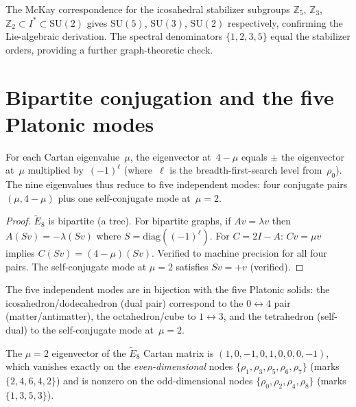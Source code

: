 \begin{remark}
The McKay correspondence for the icosahedral stabilizer subgroups
$\mathbb{Z}_5$, $\mathbb{Z}_3$, $\mathbb{Z}_2 \subset I^* \subset \mathrm{SU}(2)$
gives $\mathrm{SU}(5)$, $\mathrm{SU}(3)$, $\mathrm{SU}(2)$
respectively, confirming the Lie-algebraic derivation.
The spectral denominators $\{1,2,3,5\}$ equal the stabilizer orders,
providing a further graph-theoretic check.
\end{remark}

\section{Bipartite conjugation and the five Platonic modes}
\label{sec:bipartite}

\begin{theorem}\label{thm:bipartite}
For each Cartan eigenvalue~$\mu$, the eigenvector at~$4-\mu$ equals
$\pm$ the eigenvector at~$\mu$ multiplied by~$(-1)^{\ell}$
(where~$\ell$ is the breadth-first-search level from~$\rho_0$).
The nine eigenvalues thus reduce to five independent modes:
four conjugate pairs $(\mu, 4-\mu)$ plus one self-conjugate mode at~$\mu = 2$.
\end{theorem}

\begin{proof}
$\tilde{E}_8$ is bipartite (a tree).  For bipartite graphs,
if $Av = \lambda v$ then $A(Sv) = -\lambda(Sv)$ where $S = \mathrm{diag}((-1)^\ell)$.
For $C = 2I - A$: $Cv = \mu v$ implies $C(Sv) = (4-\mu)(Sv)$.
Verified to machine precision for all four pairs.
The self-conjugate mode at $\mu = 2$ satisfies $Sv = +v$ (verified).
\end{proof}

The five independent modes are in bijection with the five Platonic solids:
the icosahedron/dodecahedron (dual pair) correspond to the $0 \leftrightarrow 4$
pair (matter/antimatter), the octahedron/cube to $1 \leftrightarrow 3$,
and the tetrahedron (self-dual) to the self-conjugate mode at~$\mu = 2$.

\begin{corollary}[$\mu = 2$ vanishing on even-dimensional nodes]\label{cor:mu2-vanishing}
The $\mu = 2$ eigenvector of the $\tilde{E}_8$ Cartan matrix is
$(1, 0, -1, 0, 1, 0, 0, 0, -1)$, which vanishes exactly on the
\emph{even-dimensional} nodes $\{\rho_1, \rho_3, \rho_5, \rho_6, \rho_7\}$
(marks $\{2, 4, 6, 4, 2\}$) and is nonzero on the odd-dimensional nodes
$\{\rho_0, \rho_2, \rho_4, \rho_8\}$ (marks $\{1, 3, 5, 3\}$).
\end{corollary}

